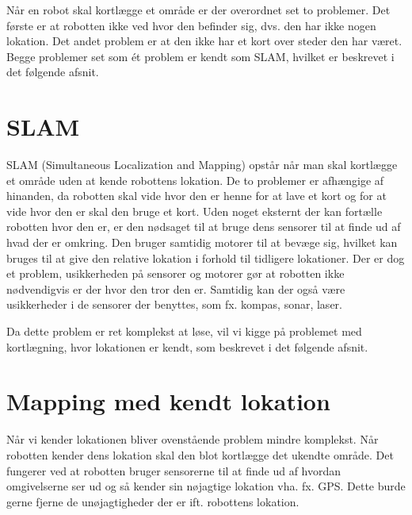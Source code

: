 Når en robot skal kortlægge et område er der overordnet set to problemer. 
Det første er at robotten ikke ved hvor den befinder sig, dvs. den har ikke nogen lokation.
Det andet problem er at den ikke har et kort over steder den har været.
Begge problemer set som ét problem er kendt som SLAM, hvilket er beskrevet i det følgende afsnit.

\section*{SLAM}\label{SLAM}
SLAM (Simultaneous Localization and Mapping) opstår når man skal kortlægge et område uden at kende robottens lokation.
De to problemer er afhængige af hinanden, da robotten skal vide hvor den er henne for at lave et kort og for at vide hvor den er skal den bruge et kort.
Uden noget eksternt der kan fortælle robotten hvor den er, er den nødsaget til at bruge dens sensorer til at finde ud af hvad der er omkring.
Den bruger samtidig motorer til at bevæge sig, hvilket kan bruges til at give den relative lokation i forhold til tidligere lokationer.
Der er dog et problem, usikkerheden på sensorer og motorer gør at robotten ikke nødvendigvis er der hvor den tror den er.
Samtidig kan der også være usikkerheder i de sensorer der benyttes, som fx. kompas, sonar, laser.

Da dette problem er ret komplekst at løse, vil vi kigge på problemet med kortlægning, hvor lokationen er kendt, som beskrevet i det følgende afsnit.

\section*{Mapping med kendt lokation}\label{map_lok}
Når vi kender lokationen bliver ovenstående problem mindre komplekst.
Når robotten kender dens lokation skal den blot kortlægge det ukendte område.
Det fungerer ved at robotten bruger sensorerne til at finde ud af hvordan omgivelserne ser ud og så kender sin nøjagtige lokation vha. fx. GPS.
Dette burde gerne fjerne de unøjagtigheder der er ift. robottens lokation.
